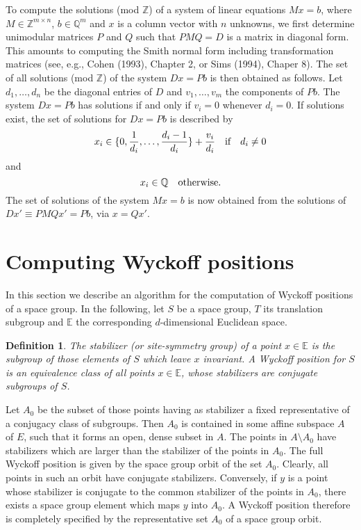\documentclass[12pt]{amsart}
\newcommand{\E}{{\mathbb E}}
\newcommand{\Q}{{\mathbb Q}}
\newcommand{\Z}{{\mathbb Z}}
\newtheorem{definition}[theorem]{Definition}
\begin{document}
To compute the solutions (mod $\Z$) of a system of linear equations
$Mx=b$, where $M\in \Z^{m\times n}$, $b\in \Q^m$ and $x$ is a column 
vector with $n$ unknowns, we first determine unimodular 
matrices $P$ and $Q$ such that $PMQ = D$ is a matrix in diagonal form.  
This amounts to computing the Smith normal form including 
transformation matrices (see, e.g., Cohen (1993), Chapter 2, or
Sims (1994), Chaper 8). The set of all solutions (mod $\Z$) of 
the system $Dx= Pb$ is then obtained as follows.
Let $d_1,\ldots,d_n$ be the diagonal entries of $D$ and
$v_1,\ldots,v_m$ the components of $Pb.$ The system $Dx = Pb$ has
solutions if and only if $v_i=0$ whenever $d_i=0$.
If solutions exist, the set of solutions for $Dx=Pb$ 
is described by
$$
x_{i}\in\{0,\frac{1}{d_{i}},\ldots,\frac{d_{i}-1}{d_{i}}\} + 
\frac{v_{i}}{d_{i}}\quad \hbox{if}\quad d_{i}\not=0
$$
and
$$x_{i}\in\Q\quad\hbox{otherwise.}$$
The set of solutions of the system $Mx=b$ is now obtained from the
solutions of $Dx'\equiv PMQx'=Pb$, via $x=Qx'$.

\section{Computing Wyckoff positions}
\label{swyck}

In this section we describe an algorithm for the computation of Wyckoff 
positions of a space group. In the following, let $S$ be a space group, 
$T$ its translation subgroup and $\E$ the corresponding $d$-dimensional 
Euclidean space.  

\begin{definition}\label{defwyckoff} 
The {\em stabilizer} (or {\em site-symmetry group}) of a point $x\in\E$ 
is the subgroup of those elements of $S$ which leave $x$ invariant.
A {\em Wyckoff position} for $S$ is an equivalence class of all 
points $x\in\E$, whose stabilizers are conjugate subgroups of $S$.
\end{definition}

Let $A_0$ be the subset of those points having as stabilizer a fixed
representative of a conjugacy class of subgroups. Then $A_0$ is
contained in some affine subspace $A$ of $E$, such that it forms an
open, dense subset in $A$. The points in $A \setminus A_0$ have
stabilizers which are larger than the stabilizer of the points in
$A_0$. The full Wyckoff position is given by the space group orbit of
the set $A_0$. Clearly, all points in such an orbit have conjugate
stabilizers. Conversely, if $y$ is a point whose stabilizer is
conjugate to the common stabilizer of the points in $A_0$, there
exists a space group element which maps $y$ into $A_0$.  A Wyckoff
position therefore is completely specified by the representative set
$A_0$ of a space group orbit.
\end{document}
